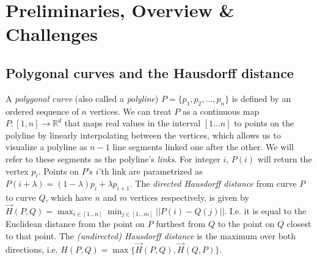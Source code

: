 \documentclass[]{llncs}
\begin{document}
\section {Preliminaries, Overview \& Challenges} \label {sec:pre}

\subsection{Polygonal curves and the Hausdorff distance}
A \emph{polygonal curve} (also called a \emph{polyline})  $P = \{p_1,p_2,\ldots,p_n\}$ is defined by an ordered sequence of $n$ vertices. We can treat $P$ as a continuous map $P : [1,n] \rightarrow \mathbb{R}^d$ that maps real values in the interval \([1 \ldots n]\) to points
on the polyline by linearly interpolating between the vertices, which allows us to visualize a polyline as $n-1$ line segments linked one after the other. We will refer to these segments as the polyline's \emph{links}. For integer $i$, $P(i)$ will return the vertex $p_i$. Points on $P$'s $i$'th link are parametrized as
\( P(i + \lambda) = (1-\lambda)p_i + \lambda p_{i+1} \).
The \emph{directed Hausdorff distance} from curve $P$ to curve $Q$, which have $n$ and $m$ vertices respectively, is given by $\overrightarrow{H}(P,Q) = \displaystyle\max_{i \in [1 \ldots n]}\min_{j \in [1 \ldots m]} ||P(i) - Q(j)||$. I.e. it is equal to the Euclidean distance from the point on $P$ furthest from $Q$ to the point on $Q$ closest to that point. The \emph{(undirected) Hausdorff distance} is the maximum over both directions, i.e. $H(P,Q) = \max \{\overrightarrow{H}(P,Q),\overrightarrow{H}(Q,P)\}$.
\end{document}
